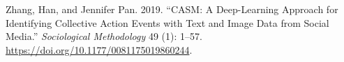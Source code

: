 \documentclass{article}
\newlength{\cslhangindent}
\newlength{\cslentryspacingunit} %
\newenvironment{CSLReferences}[2] %
 {%
  \setlength{\parindent}{0pt}
  \ifodd #1
  \let\oldpar\par
  \def\par{\hangindent=\cslhangindent\oldpar}
  \fi
  \setlength{\parskip}{#2\cslentryspacingunit}
 }%
 {}
\begin{document}
\begin{CSLReferences}{1}{0}
\leavevmode{}%
Zhang, Han, and Jennifer Pan. 2019. {``{CASM}: {A Deep-Learning
Approach} for {Identifying Collective Action Events} with {Text} and
{Image Data} from {Social Media}.''} \emph{Sociological Methodology} 49
(1): 1--57. \url{https://doi.org/10.1177/0081175019860244}.

\end{CSLReferences}



\end{document}
